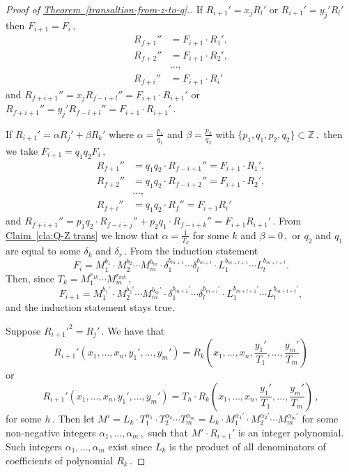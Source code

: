 \documentclass[11pt]{article}
\newcommand{\expref}[2]{\texorpdfstring{\hyperref[#2]{#1~\ref{#2}}}{#1~\ref{#2}}}
\newcommand{\Z}{{\mathbb Z}}
\begin{document}
\begin{proof}[Proof of \expref{Theorem}{transaltion-from-z-to-q}.]
 If $R_{i + 1}' = x_j R_l'$ or $R_{i + 1}' = y_j' R_l'$ then %
$F_{i + 1} = F_i\,,$ %
\begin{align*}
R_{f + 1}'' &= F_{i + 1} \cdot R_1', \\ R_{f + 2}'' &= F_{i + 1} \cdot R_2', \\ &\ldots, \\  R_{f + i}'' &= F_{i + 1} \cdot R_i'
\end{align*}
%
and $R_{f + i + 1}'' = x_j R_{f - i + l}'' = F_{i + 1} \cdot R_{i + 1}'$ or %
$R_{f + i + 1}'' = y_j' R_{f - i + l}'' = F_{i + 1} \cdot R_{i + 1}'\,.$ %
%

%
 If $R_{i + 1}' = \alpha R_j' + \beta R_k'$ where $\alpha = \frac{p_1}{q_1}$ and $\beta = \frac{p_2}{q_2}$ with %
$\{p_1, q_1, p_2, q_2\} \subset \Z\,,$ %
 then we take %
$F_{i + 1} = q_1 q_2 F_i\,,$ %
%
\begin{align*}
R_{f + 1}'' &= q_1 q_2 \cdot R_{f - i + 1}'' = F_{i + 1} \cdot R_1', \\ R_{f + 2}'' &= q_1 q_2 \cdot R_{f - i + 2}'' = F_{i + 1} \cdot R_2', \\ &\ldots, \\ R_{f + i}'' &= q_1 q_2 \cdot R_{f}'' = F_{i + 1} R_{i}'  
\end{align*}
%
and %
$R_{f + i + 1}'' = p_1 q_2 \cdot R_{f - i + j}'' + p_2 q_1 \cdot R_{f - i + k}'' = F_{i + 1} R_{i + 1}'\,.$ %
 From \expref{Claim}{cla:Q-Z trans} we know that $\alpha = \frac{1}{T_k}$ for some $k$ and %
$\beta = 0\,,$ %
 or $q_2$ and $q_1$ are equal to some $\delta_k$ and %
$\delta_r\,.$ %
 From the induction statement %
$$
F_i = M_1^{b_1} \cdot M_2^{b_2} \cdots M_m^{b_m} \cdot \delta_1^{b_{m + 1}} \cdots \delta_l^{b_{m + l}} \cdot  L_1^{b_{m + l + 1}} \cdots L_t^{b_{m + l + t}}.
$$
Then, since %
$T_k = M_1^{r_{1 k}} \cdots M_m^{r_{m k}}\,,$ %
$$
F_{i + 1} = M_1^{b_1'} \cdot M_2^{b_2'} \cdots M_m^{b_m'} \cdot \delta_1^{b_{m + 1}'} \cdots \delta_l^{b_{m + l}'} \cdot  L_1^{b_{m + l + 1}'} \cdots L_t^{b_{m + l + t}'},
$$
and the induction statement stays true.

 Suppose %
$R_{i + 1}'^2 = R_j'\,.$ %
 We have that
$$
R_{i  +1}'(x_1, \ldots, x_n, y_1', \ldots,y_m') = R_{k}(x_1, \ldots, x_n, \frac{y_1'}{T_1}, \ldots, \frac{y_m'}{T_m})
$$ or $$
%
R_{i  +1}'(x_1, \ldots, x_n, y_1', \ldots,y_m') = T_h \cdot R_{k}(x_1, \ldots, x_n, \frac{y_1'}{T_1}, \ldots, \frac{y_m'}{T_m})\,, %
$$
for some %
$h\,.$ %
 Then let $M' = L_k \cdot T_1^{\alpha_1} \cdot T_2^{\alpha_2} \cdots T_m^{\alpha_m} = L_k \cdot M_1^{\alpha_1'} \cdot M_2^{\alpha_2'} \cdots M_m^{\alpha_m'}$ for some non-negative integers %
$\alpha_1, \ldots, \alpha_m\,,$ %
 such that $M' \cdot R_{i + 1}'$ is an integer polynomial. Such integers $\alpha_1, \ldots, \alpha_m$ exist since $L_k$ is the product of all denominators of coefficients of polynomial %
$R_k\,.$ %



\end{proof}
\end{document}
